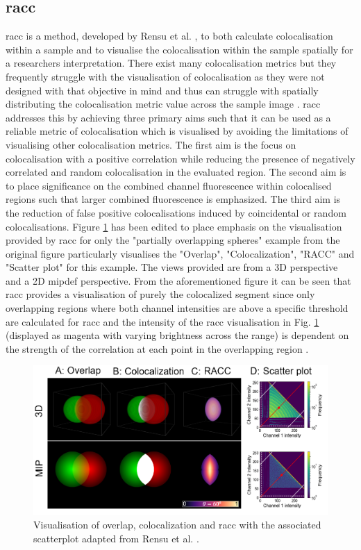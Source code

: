 \subsection{\gls{racc}}
\gls{racc} is a method, developed by Rensu et al. \cite{racc}, to both calculate colocalisation within a sample and to visualise the colocalisation within the sample spatially for a researchers interpretation. There exist many colocalisation metrics but they frequently struggle with the visualisation of colocalisation as they were not designed with that objective in mind and thus can struggle with spatially distributing the colocalisation metric value across the sample image \cite[p. 4]{racc}. \gls{racc} addresses this by achieving three primary aims such that it can be used as a reliable metric of colocalisation which is visualised by avoiding the limitations of visualising other colocalisation metrics. The first aim is the focus on colocalisation with a positive correlation while reducing the presence of negatively correlated and random colocalisation in the evaluated region. The second aim is to place significance on the combined channel fluorescence within colocalised regions such that larger combined fluorescence is emphasized. The third aim is the reduction of false positive colocalisations induced by coincidental or random colocalisations. Figure \ref{fig:racc_example} has been edited to place emphasis on the visualisation provided by \gls{racc} for only the "partially overlapping spheres" example from the original figure particularly visualises the "Overlap", "Colocalization", "RACC" and "Scatter plot" for this example. The views provided are from a 3D perspective and a 2D \gls{mipdef} perspective. From the aforementioned figure it can be seen that \gls{racc} provides a visualisation of purely the colocalized segment since only overlapping regions where both channel intensities are above a specific threshold are calculated for \gls{racc} and the intensity of the \gls{racc} visualisation in Fig. \ref{fig:racc_example} (displayed as magenta with varying brightness across the range) is dependent on the strength of the correlation at each point in the overlapping region \cite[p. 13-14]{racc}.

\begin{figure}
    \centering
    \includegraphics[width=\textwidth]{figs/raccSynth.png}
    \caption{Visualisation of overlap, colocalization and \gls{racc} with the associated scatterplot adapted from Rensu et al. \cite[p. 13]{racc}.}
    \label{fig:racc_example}
\end{figure}


